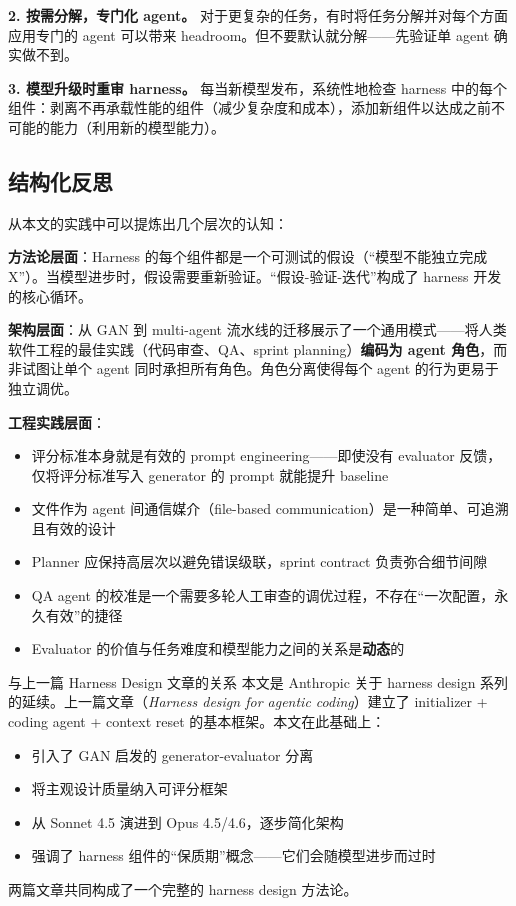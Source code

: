 \documentclass[a4paper]{article}
\begin{document}
\textbf{2. 按需分解，专门化 agent。} 对于更复杂的任务，有时将任务分解并对每个方面应用专门的 agent 可以带来 headroom。但不要默认就分解——先验证单 agent 确实做不到。

\textbf{3. 模型升级时重审 harness。} 每当新模型发布，系统性地检查 harness 中的每个组件：剥离不再承载性能的组件（减少复杂度和成本），添加新组件以达成之前不可能的能力（利用新的模型能力）。

\subsection{结构化反思}

从本文的实践中可以提炼出几个层次的认知：

\textbf{方法论层面}：Harness 的每个组件都是一个可测试的假设（``模型不能独立完成 X''）。当模型进步时，假设需要重新验证。``假设-验证-迭代''构成了 harness 开发的核心循环。

\textbf{架构层面}：从 GAN 到 multi-agent 流水线的迁移展示了一个通用模式——将人类软件工程的最佳实践（代码审查、QA、sprint planning）\textbf{编码为 agent 角色}，而非试图让单个 agent 同时承担所有角色。角色分离使得每个 agent 的行为更易于独立调优。

\textbf{工程实践层面}：
\begin{itemize}[leftmargin=1.5em]
    \item 评分标准本身就是有效的 prompt engineering——即使没有 evaluator 反馈，仅将评分标准写入 generator 的 prompt 就能提升 baseline
    \item 文件作为 agent 间通信媒介（file-based communication）是一种简单、可追溯且有效的设计
    \item Planner 应保持高层次以避免错误级联，sprint contract 负责弥合细节间隙
    \item QA agent 的校准是一个需要多轮人工审查的调优过程，不存在``一次配置，永久有效''的捷径
    \item Evaluator 的价值与任务难度和模型能力之间的关系是\textbf{动态}的
\end{itemize}

\begin{knowledgebox}{与上一篇 Harness Design 文章的关系}
本文是 Anthropic 关于 harness design 系列的延续。上一篇文章（\textit{Harness design for agentic coding}）建立了 initializer + coding agent + context reset 的基本框架。本文在此基础上：
\begin{itemize}[leftmargin=1.5em]
    \item 引入了 GAN 启发的 generator-evaluator 分离
    \item 将主观设计质量纳入可评分框架
    \item 从 Sonnet 4.5 演进到 Opus 4.5/4.6，逐步简化架构
    \item 强调了 harness 组件的``保质期''概念——它们会随模型进步而过时
\end{itemize}
两篇文章共同构成了一个完整的 harness design 方法论。
\end{knowledgebox}
\end{document}
